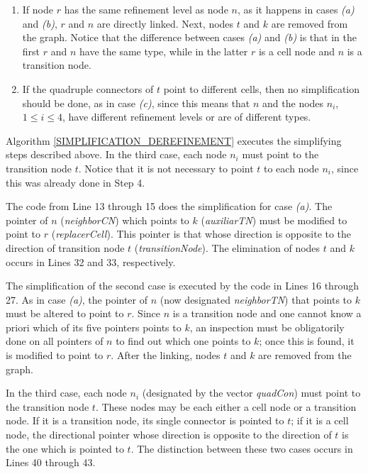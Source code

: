 \begin{enumerate}
 \item If node $r$ has the same refinement level as node $n$, as it
 happens in cases \textit{(a)} and \textit{(b)}, $r$ and $n$ are
 directly linked. Next, nodes $t$ and $k$ are removed from the graph. Notice that the difference between cases \textit{(a)}
 and \textit{(b)} is that in the first $r$ and $n$ have the same type, while in the latter $r$ is a cell node and
 $n$ is a transition node.

 \item If the quadruple connectors of $t$ point to different cells, then no simplification should be done,
 as in case \textit{(c)}, since this means that $n$ and the nodes $n_i$, $1 \leqslant i \leqslant 4$, have different refinement levels
 or are of different types.
\end{enumerate}

Algorithm \ref{SIMPLIFICATION_DEREFINEMENT} executes the simplifying
steps described above. In the third case, each node
$n_{i}$ must point to the transition node $t$. Notice that it is not
necessary to point $t$ to each node $n_{i}$, since this was already
done in Step 4.

The code from Line 13 through 15 does the simplification for case
\textit{(a)}. The pointer of $n$ (\textit{neighborCN}) which points
to $k$ (\textit{auxiliarTN}) must be modified to point to $r$
(\textit{replacerCell}). This pointer is that whose direction is
opposite to the direction of transition node $t$
(\textit{transitionNode}). The elimination of nodes $t$ and $k$
occurs in Lines 32 and 33, respectively.

The simplification of the second case is executed by the code in Lines
16 through 27. As in case \textit{(a)}, the pointer of $n$ (now
designated \textit{neighborTN}) that points to $k$ must be altered
to point to $r$. Since $n$ is a transition node and one cannot know
a priori which of its five pointers points to $k$, an inspection
must be obligatorily done on all pointers of $n$ to find out which
one points to $k$; once this is found, it is modified to point to
$r$. After the linking, nodes $t$ and $k$ are removed from the
graph.

In the third case, each node $n_i$ (designated by the vector
\textit{quadCon}) must point to the transition node $t$. These nodes
may be each either a cell node or a transition node. If it is a
transition node, its single connector is pointed to $t$; if it is a
cell node, the directional pointer whose direction is opposite to
the direction of $t$ is the one which is pointed to $t$. The
distinction between these two cases occurs in Lines 40 through 43.

